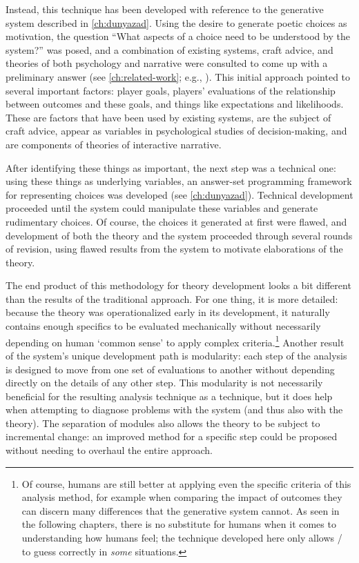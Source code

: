 Instead, this technique has been developed with reference to the generative system described in \cref{ch:dunyazad}.
%
Using the desire to generate poetic choices as motivation, the question ``What aspects of a choice need to be understood by the system?'' was posed, and a combination of existing systems, craft advice, and theories of both psychology and narrative were consulted to come up with a preliminary answer (see \cref{ch:related-work}; e.g., \citep{Mott2006,ChoiceOfGamesChoiceRules,Shepperd2002,WardripFruin2009}).
%
This initial approach pointed to several important factors: player goals, players' evaluations of the relationship between outcomes and these goals, and things like expectations and likelihoods.
%
These are factors that have been used by existing systems, are the subject of craft advice, appear as variables in psychological studies of decision-making, and are components of theories of interactive narrative.


After identifying these things as important, the next step was a technical one: using these things as underlying variables, an answer-set programming framework for representing choices was developed (see \cref{ch:dunyazad}).
%
Technical development proceeded until the system could manipulate these variables and generate rudimentary choices.
%
Of course, the choices it generated at first were flawed, and development of both the theory and the system proceeded through several rounds of revision, using flawed results from the system to motivate elaborations of the theory.


The end product of this methodology for theory development looks a bit different than the results of the traditional approach.
%
For one thing, it is more detailed: because the theory was operationalized early in its development, it naturally contains enough specifics to be evaluated mechanically without necessarily depending on human `common sense' to apply complex criteria.\footnote{%
Of course, humans are still better at applying even the specific criteria of this analysis method, for example when comparing the impact of outcomes they can discern many differences that the generative system cannot.
%
As seen in the following chapters, there is no substitute for humans when it comes to understanding how humans feel; the technique developed here only allows \dunyazad/ to guess correctly in \emph{some} situations.
}
%
Another result of the system's unique development path is modularity: each step of the analysis is designed to move from one set of evaluations to another without depending directly on the details of any other step.
%
This modularity is not necessarily beneficial for the resulting analysis technique as a technique, but it does help when attempting to diagnose problems with the system (and thus also with the theory).
%
The separation of modules also allows the theory to be subject to incremental change: an improved method for a specific step could be proposed without needing to overhaul the entire approach.



